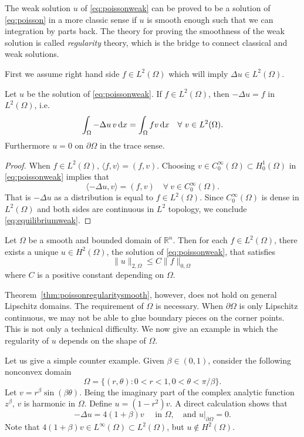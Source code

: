 The weak solution $u$ of \eqref{eq:poissonweak} can be proved to be a solution of \eqref{eq:poisson} in a
more classic sense if $u$ is smooth enough such that we can integration by parts back. The
theory for proving the smoothness of the weak solution is called {\it regularity} theory, which
is the bridge to connect classical and weak solutions.

First we assume right hand side $f\in L^2(\Omega)$ which will imply $\Delta u\in L^2(\Omega)$.
\begin{theorem}
Let $u$ be the solution of \eqref{eq:poissonweak}. If $f\in L^2(\Omega)$, then $-\Delta u = f$ in $L^2(\Omega)$, i.e.
\begin{equation}\label{eq:equilibriumweak}
\int_{\Omega}-\Delta u \,v\,{\rm d}x=\int_{\Omega}fv\,{\rm d}x\quad\forall~v\in L^2(\Omega).
\end{equation}
Furthermore $u = 0$ on $\partial\Omega$ in the trace sense.
\end{theorem}
\begin{proof}
When $f\in L^2(\Omega)$, $\langle f, v\rangle = (f, v)$. Choosing $v\in C_0^{\infty}(\Omega)\subset H_0^1(\Omega)$ in \eqref{eq:poissonweak} implies that
\[
\langle-\Delta u, v\rangle = (f, v)\quad\forall~v\in C_0^{\infty}(\Omega).
\]
That is $-\Delta u$ as a distribution is equal to $f\in L^2(\Omega)$. Since $C_0^{\infty}(\Omega)$ is dense in $L^2(\Omega)$ and
both sides are continuous in $L^2$ topology, we conclude \eqref{eq:equilibriumweak}.
\end{proof}

\begin{theorem}\label{thm:poissonregularitysmooth}
Let $\Omega$ be a smooth and bounded domain of $\mathbb R^n$. Then for each $f \in L^2(\Omega)$,
there exists a unique $u\in H^2(\Omega)$, the solution of \eqref{eq:poissonweak}, that satisfies
\[
\|u\|_{2,\Omega}\leq C\|f\|_{0,\Omega}
\]
where $C$ is a positive constant depending on $\Omega$.
\end{theorem}

Theorem~\ref{thm:poissonregularitysmooth}, however, does not hold on general Lipschitz domains.
The requirement of $\Omega$ is necessary. When $\partial\Omega$ is only Lipschitz continuous, we may not
be able to glue boundary pieces on the corner points. This is not only a technical difficulty.
We now give an example in which the regularity of $u$ depends on the shape of $\Omega$.
\begin{example}
Let us give a simple counter example. Given $\beta\in (0, 1)$, consider the
following nonconvex domain
\[
\Omega=\{(r, \theta): 0<r<1, 0<\theta<\pi/\beta\}.
\]
Let $v = r^{\beta}\sin(\beta\theta)$. Being the imaginary part of the complex analytic function $z^{\beta}$, $v$ is
harmonic in $\Omega$. Define $u = (1-r^2)v$. A direct calculation shows that
\[
-\Delta u=4(1+\beta)v\quad\textrm{  in }\Omega,\quad\textrm{and } u|_{\partial\Omega}=0.
\]
Note that $4(1+\beta)v\in L^{\infty}(\Omega)\subset L^2(\Omega)$, but $u\notin H^2(\Omega)$.
\end{example}


